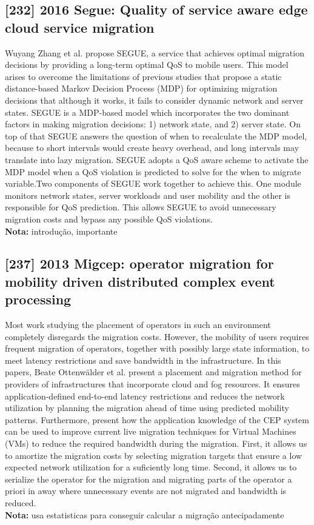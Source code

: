 \subsection{[232] 2016 Segue: Quality of service aware edge cloud service migration}
\label{subsec:paper10}
Wuyang Zhang et al. \cite{zhang2016segue} propose SEGUE, a service that achieves optimal migration decisions by providing a long-term optimal QoS to mobile users. This model arises to overcome the limitations of previous studies that propose a static distance-based Markov Decision Process (MDP) for optimizing migration decisions that although it works, it fails to consider dynamic network and server states. SEGUE is a MDP-based model which incorporates the two dominant factors in making migration decisions: 1) network state, and 2) server state. On top of that SEGUE answers the question of when to recalculate the MDP model, because to short intervals would create heavy overhead, and long intervals may translate into lazy migration. SEGUE adopts a QoS aware scheme to activate the MDP model when a QoS violation is predicted to solve for the when to migrate variable.Two components of SEGUE work together to achieve this. One module monitors network states, server workloads and user mobility and the other is responsible for QoS prediction. This allows SEGUE to avoid unnecessary migration costs and bypass any possible QoS violations.\\
\textbf{Nota:} introdução, importante

\subsection{[237] 2013 Migcep: operator migration for mobility driven distributed complex event processing}
\label{subsec:paper12}
Most work studying the placement of operators in such an environment completely disregards the migration costs. However, the mobility of users requires frequent migration of operators, together with possibly large state information, to meet latency restrictions and save bandwidth in the infrastructure. In this papers, Beate Ottenwälder et al. \cite{ottenwalder2013migcep} present a placement and migration method for providers of infrastructures that incorporate cloud and fog resources. It ensures application-defined end-to-end latency restrictions and reduces the network utilization by planning the migration ahead of time using predicted mobility patterns. Furthermore, present how the application knowledge of the CEP system can be used to improve current live migration techniques for Virtual Machines (VMs) to reduce the required bandwidth during the migration. First, it allows us to amortize the migration costs by selecting migration targets that ensure a low expected network utilization for a suficiently long time. Second, it allows us to serialize the operator for the migration and migrating parts of the operator a priori in away where unnecessary events are not migrated and bandwidth is reduced.\\
\textbf{Nota:} usa estatisticas para conseguir calcular a migração antecipadamente

